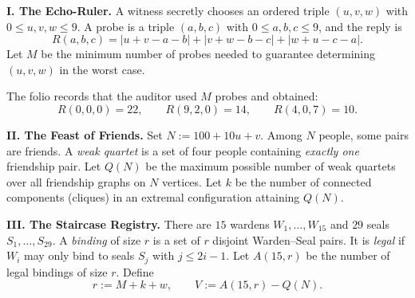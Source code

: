 

\Problem
\textbf{I. The Echo-Ruler.}
A witness secretly chooses an ordered triple \((u,v,w)\) with \(0\le u,v,w\le 9\).
A probe is a triple \((a,b,c)\) with \(0\le a,b,c\le 9\), and the reply is
\[
R(a,b,c)=|u+v-a-b|+|v+w-b-c|+|w+u-c-a|.
\]
Let \(M\) be the minimum number of probes needed to guarantee determining \((u,v,w)\) in the worst case.

The folio records that the auditor used \(M\) probes and obtained:
\[
R(0,0,0)=22,\qquad R(9,2,0)=14,\qquad R(4,0,7)=10.
\]

\medskip
\textbf{II. The Feast of Friends.}
Set \(N:=100+10u+v\).
Among \(N\) people, some pairs are friends. A \emph{weak quartet} is a set of four people containing
\emph{exactly one} friendship pair.
Let \(Q(N)\) be the maximum possible number of weak quartets over all friendship graphs on \(N\) vertices.
Let \(k\) be the number of connected components (cliques) in an extremal configuration attaining \(Q(N)\).

\medskip
\textbf{III. The Staircase Registry.}
There are \(15\) wardens \(W_1,\dots,W_{15}\) and \(29\) seals \(S_1,\dots,S_{29}\).
A \emph{binding} of size \(r\) is a set of \(r\) disjoint Warden--Seal pairs.
It is \emph{legal} if \(W_i\) may only bind to seals \(S_j\) with \(j\le 2i-1\).
Let \(A(15,r)\) be the number of legal bindings of size \(r\).
Define
\[
r:=M+k+w,\qquad V:=A(15,r)-Q(N).
\]

\medskip
{}

